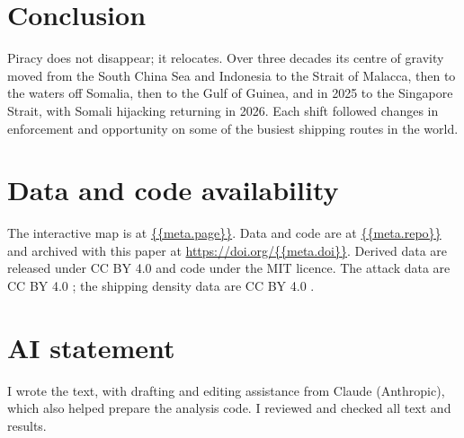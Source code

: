 \documentclass[11pt,a4paper]{article}
\begin{document}
\section{Conclusion}
Piracy does not disappear; it relocates. Over three decades its centre of gravity moved from the South China Sea and Indonesia to the Strait of Malacca, then to the waters off Somalia, then to the Gulf of Guinea, and in 2025 to the Singapore Strait, with Somali hijacking returning in 2026. Each shift followed changes in enforcement and opportunity on some of the busiest shipping routes in the world.

\section*{Data and code availability}
The interactive map is at \url{{{meta.page}}}. Data and code are at \url{{{meta.repo}}} and archived with this paper at \url{https://doi.org/{{meta.doi}}}. Derived data are released under CC BY 4.0 and code under the MIT licence. The attack data are CC BY 4.0 \citep{benden}; the shipping density data are CC BY 4.0 \citep{wbships}.

\section*{AI statement}
I wrote the text, with drafting and editing assistance from Claude (Anthropic), which also helped prepare the analysis code. I reviewed and checked all text and results.
\end{document}
